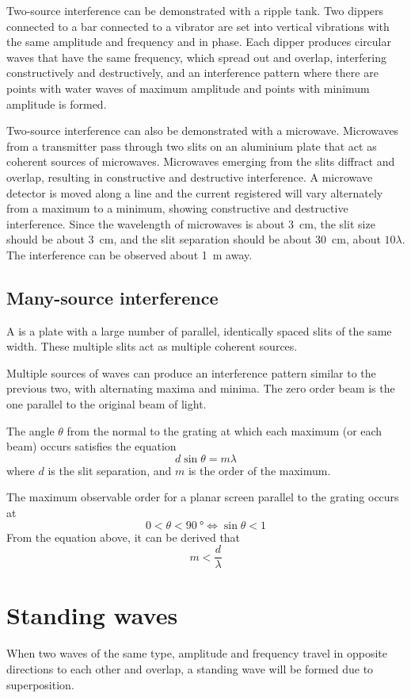 \documentclass[Physics.tex]{subfiles}
\begin{document}
Two-source interference can be demonstrated with a ripple tank. Two dippers connected to a bar connected to a vibrator are set into vertical vibrations with the same amplitude and frequency and in phase. Each dipper produces circular waves that have the same frequency, which spread out and overlap, interfering constructively and destructively, and an interference pattern where there are points with water waves of maximum amplitude and points with minimum amplitude is formed.

Two-source interference can also be demonstrated with a microwave. Microwaves from a transmitter pass through two slits on an aluminium plate that act as coherent sources of microwaves. Microwaves emerging from the slits diffract and overlap, resulting in constructive and destructive interference. A microwave detector is moved along a line and the current registered will vary alternately from a maximum to a minimum, showing constructive and destructive interference. Since the wavelength of microwaves is about \SI{3}{\centi\metre}, the slit size should be about \SI{3}{\centi\metre}, and the slit separation should be about \SI{30}{\centi\metre}, about \(10\lambda\). The interference can be observed about \SI{1}{\metre} away.
\subsection{Many-source interference}
A  is a plate with a large number of parallel, identically spaced slits of the same width. These multiple slits act as multiple coherent sources.

Multiple sources of waves can produce an interference pattern similar to the previous two, with alternating maxima and minima. The zero order beam is the one parallel to the original beam of light.

The angle \(\theta\) from the normal to the grating at which each maximum (or each beam) occurs satisfies the equation \begin{equation}d\sin\theta = m\lambda\end{equation} where \(d\) is the slit separation, and \(m\) is the order of the maximum.

The maximum observable order for a planar screen parallel to the grating occurs at \[0 < \theta < \SI{90}{\degree} \iff \sin\theta < 1\] From the equation above, it can be derived that \begin{equation}m < \frac{d}{\lambda}\end{equation}
\section{Standing waves}
When two waves of the same type, amplitude and frequency travel in opposite directions to each other and overlap, a standing wave will be formed due to superposition.
\end{document}
